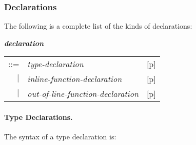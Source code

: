 \documentclass[12pt]{article}
\newcommand{\subsubsubsection}[1]{\paragraph[#1]{#1.}}
\newcommand{\emkey}[1]{{\em \bfseries #1}}
\newcommand{\pagref}[1]{p\pageref{#1}}
\newenvironment{indpar}[1][0.3in]%
	{\begin{list}{}%
		     {\setlength{\itemsep}{0in}%
		      \setlength{\topsep}{0in}%
		      \setlength{\parsep}{1ex}%
		      \setlength{\labelwidth}{#1}%
		      \setlength{\leftmargin}{#1}%
		      \addtolength{\leftmargin}{\labelsep}}%
	 \item}%
	{\end{list}}
\begin{document}
\subsubsection{Declarations}
\label{DECLARATIONS}

The following is a complete list of the kinds of declarations:
\begin{indpar}
\emkey{declaration}\label{DECLARATION}
    \begin{tabular}[t]{@{}rll}
    ::= & {\em type-declaration}
        & [\pagref{TYPE-DECLARATIONS}] \\
    $|$ & {\em inline-function-declaration}
        & [\pagref{INLINE-FUNCTION-DECLARATIONS}] \\
    $|$ & {\em out-of-line-function-declaration}
        & [\pagref{OUT-OF-LINE-FUNCTION-DECLARATIONS}] \\
    \end{tabular}
\end{indpar}

\subsubsubsection{Type Declarations}
\label{TYPE-DECLARATIONS}

The syntax of a type declaration is:
\end{document}
